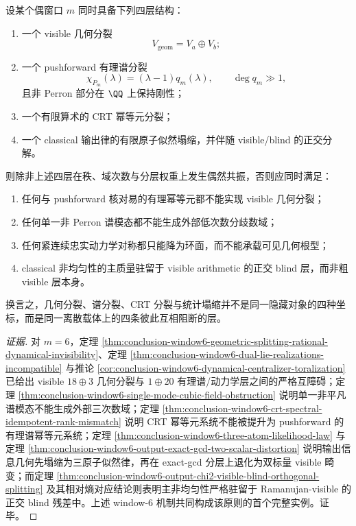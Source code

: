 

\begin{conjecture}[偶窗口的四层互障碍原则]\label{conj:conclusion-window-even-fourlayer-mutual-obstruction-principle}
设某个偶窗口 \(m\) 同时具备下列四层结构：
\begin{enumerate}
  \item 一个 visible 几何分裂
  \[
  V_{\mathrm{geom}}=V_a\oplus V_b;
  \]
  \item 一个 pushforward 有理谱分裂
  \[
  \chi_{P_m}(\lambda)=(\lambda-1)q_m(\lambda),
  \qquad
  \deg q_m\gg 1,
  \]
  且非 Perron 部分在 \(\QQ\) 上保持刚性；
  \item 一个有限算术的 CRT 幂等元分裂；
  \item 一个 classical 输出律的有限原子似然塌缩，并伴随 visible/blind 的正交分解。
\end{enumerate}
则除非上述四层在秩、域次数与分层权重上发生偶然共振，否则应同时满足：
\begin{enumerate}
  \item 任何与 pushforward 核对易的有理幂等元都不能实现 visible 几何分裂；
  \item 任何单一非 Perron 谱模态都不能生成外部低次数分歧数域；
  \item 任何紧连续忠实动力学对称都只能降为环面，而不能承载可见几何根型；
  \item classical 非均匀性的主质量驻留于 visible arithmetic 的正交 blind 层，而非粗 visible 层本身。
\end{enumerate}
换言之，几何分裂、谱分裂、CRT 分裂与统计塌缩并不是同一隐藏对象的四种坐标，而是同一离散载体上的四条彼此互相阻断的层。
\end{conjecture}
\begin{proof}[证据]
对 \(m=6\)，定理 \ref{thm:conclusion-window6-geometric-splitting-rational-dynamical-invisibility}、定理 \ref{thm:conclusion-window6-dual-lie-realizations-incompatible} 与推论 \ref{cor:conclusion-window6-dynamical-centralizer-toralization} 已给出 visible \(18\oplus 3\) 几何分裂与 \(1\oplus 20\) 有理谱/动力学层之间的严格互障碍；定理 \ref{thm:conclusion-window6-single-mode-cubic-field-obstruction} 说明单一非平凡谱模态不能生成外部三次数域；定理 \ref{thm:conclusion-window6-crt-spectral-idempotent-rank-mismatch} 说明 CRT 幂等元系统不能被提升为 pushforward 的有理谱幂等元系统；定理 \ref{thm:conclusion-window6-three-atom-likelihood-law} 与定理 \ref{thm:conclusion-window6-output-exact-gcd-two-scalar-distortion} 说明输出信息几何先塌缩为三原子似然律，再在 exact-gcd 分层上退化为双标量 visible 畸变；而定理 \ref{thm:conclusion-window6-output-chi2-visible-blind-orthogonal-splitting} 及其相对熵对应结论则表明主非均匀性严格驻留于 Ramanujan-visible 的正交 blind 残差中。上述 window-\(6\) 机制共同构成该原则的首个完整实例。证毕。
\end{proof}


